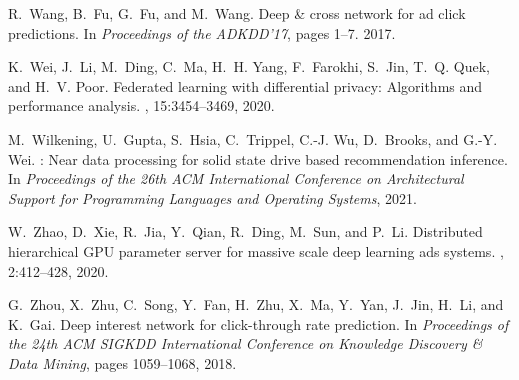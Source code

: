 \documentclass{article}
\begin{document}
\begin{thebibliography}{10}
R.~Wang, B.~Fu, G.~Fu, and M.~Wang.
\newblock Deep \& cross network for ad click predictions.
\newblock In {\em Proceedings of the ADKDD'17}, pages 1--7. 2017.

K.~Wei, J.~Li, M.~Ding, C.~Ma, H.~H. Yang, F.~Farokhi, S.~Jin, T.~Q. Quek, and
  H.~V. Poor.
\newblock Federated learning with differential privacy: Algorithms and
  performance analysis.
,
  15:3454--3469, 2020.

M.~Wilkening, U.~Gupta, S.~Hsia, C.~Trippel, C.-J. Wu, D.~Brooks, and G.-Y.
  Wei.
: Near data processing for solid state drive based
  recommendation inference.
\newblock In {\em Proceedings of the 26th ACM International Conference on
  Architectural Support for Programming Languages and Operating Systems}, 2021.

W.~Zhao, D.~Xie, R.~Jia, Y.~Qian, R.~Ding, M.~Sun, and P.~Li.
\newblock Distributed hierarchical {GPU} parameter server for massive scale
  deep learning ads systems.
, 2:412--428, 2020.

G.~Zhou, X.~Zhu, C.~Song, Y.~Fan, H.~Zhu, X.~Ma, Y.~Yan, J.~Jin, H.~Li, and
  K.~Gai.
\newblock Deep interest network for click-through rate prediction.
\newblock In {\em Proceedings of the 24th ACM SIGKDD International Conference
  on Knowledge Discovery \& Data Mining}, pages 1059--1068, 2018.

\end{thebibliography}
\end{document}
